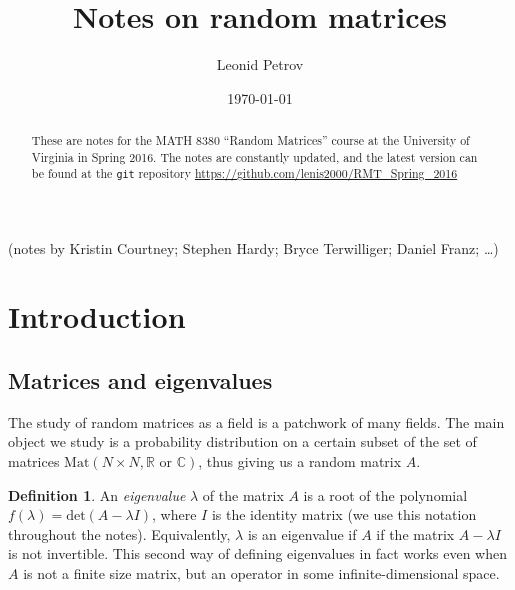 \documentclass[letterpaper,11pt,oneside,reqno]{amsart}
\numberwithin{equation}{section}
\newcommand{\note}[1]{\textsc{\color{blue}(#1)}}
\newcommand{\lect}[1]{}
\theoremstyle{definition}
\newtheorem{definition}[proposition]{Definition}
\begin{document}
\title[Notes on random matrices]{Notes on random matrices}

\author[L. Petrov]{Leonid Petrov}
\date{\today}
\maketitle

\begin{center}
	(notes by 
	Kristin Courtney;
	Stephen Hardy;
	Bryce Terwilliger;
	Daniel Franz; \ldots)
\end{center}

\begin{abstract}
	These are notes for the MATH 8380 ``Random Matrices'' course at the
	University of Virginia in Spring 2016. The notes are constantly updated,
	and the latest version can be found at the \texttt{git} repository
	\url{https://github.com/lenis2000/RMT_Spring_2016}
\end{abstract}

\bigskip


\setcounter{tocdepth}{1}
\tableofcontents
\setcounter{tocdepth}{3}

\lect{1/20/2016}

\section{Introduction} %
\label{sec:introduction}

\subsection{Matrices and eigenvalues} %
\label{sub:object_of_study}

The study of random matrices as a field is a patchwork of many fields.  The
main object we study is a probability distribution on a certain subset of the
set of matrices $\mathrm{Mat}(N\times N,\mathbb R \text{ or } \mathbb C)$,
thus giving us a random matrix $A$.

\begin{definition}
An {\it eigenvalue} $\lambda$ of the matrix $A$ is a root of the polynomial
$f(\lambda)=\text{det}(A-\lambda I)$, where $I$ is the identity matrix 
(we use this notation throughout the notes).  
Equivalently, $\lambda$ is an
eigenvalue if $A$ if the matrix $A-\lambda I$ is not invertible. This second
way of defining eigenvalues in fact works even when $A$ is not a finite
size matrix, but an operator in some infinite-dimensional space.
\end{definition}
\end{document}
